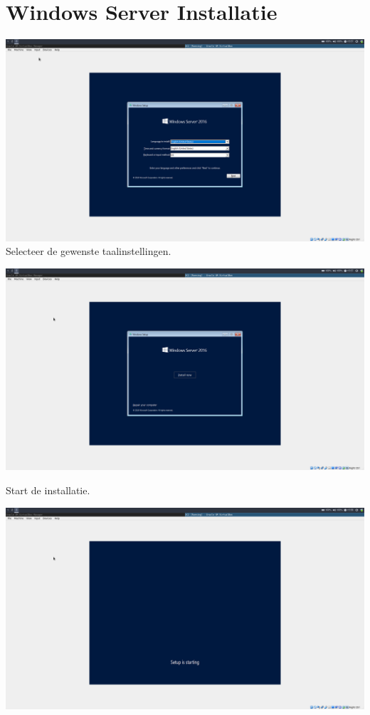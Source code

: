 \documentclass[a4paper]{article}
\begin{document}
\section{Windows Server Installatie}
\begin{center}
	\includegraphics[width=15cm]{Pictures/Windows_Install/1542293852.png}
	Selecteer de gewenste taalinstellingen.
\end{center}
\begin{center}
	\includegraphics[width=15cm]{Pictures/Windows_Install/1542293872.png}
	
	Start de installatie.
\end{center}
\begin{center}
	\includegraphics[width=15cm]{Pictures/Windows_Install/1542293887.png}
\end{center}
\end{document}
